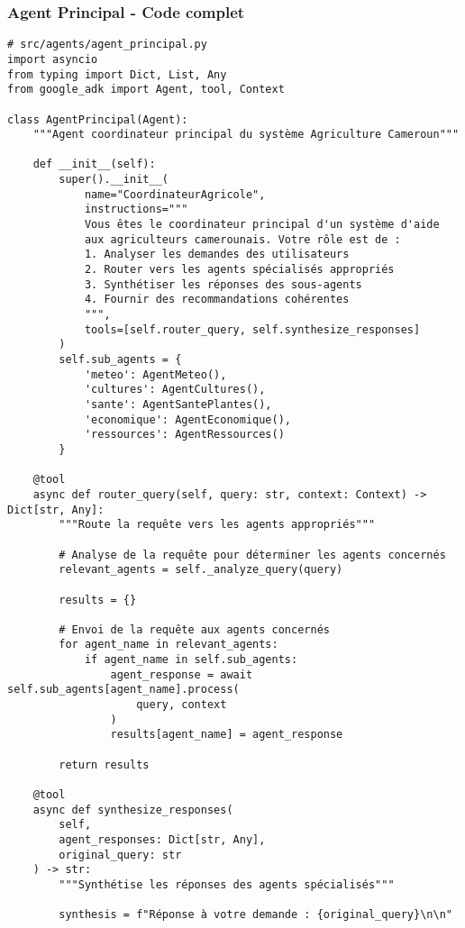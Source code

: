 \subsubsection{Agent Principal - Code complet}
\begin{verbatim}
# src/agents/agent_principal.py
import asyncio
from typing import Dict, List, Any
from google_adk import Agent, tool, Context

class AgentPrincipal(Agent):
    """Agent coordinateur principal du système Agriculture Cameroun"""

    def __init__(self):
        super().__init__(
            name="CoordinateurAgricole",
            instructions="""
            Vous êtes le coordinateur principal d'un système d'aide
            aux agriculteurs camerounais. Votre rôle est de :
            1. Analyser les demandes des utilisateurs
            2. Router vers les agents spécialisés appropriés
            3. Synthétiser les réponses des sous-agents
            4. Fournir des recommandations cohérentes
            """,
            tools=[self.router_query, self.synthesize_responses]
        )
        self.sub_agents = {
            'meteo': AgentMeteo(),
            'cultures': AgentCultures(),
            'sante': AgentSantePlantes(),
            'economique': AgentEconomique(),
            'ressources': AgentRessources()
        }

    @tool
    async def router_query(self, query: str, context: Context) -> Dict[str, Any]:
        """Route la requête vers les agents appropriés"""

        # Analyse de la requête pour déterminer les agents concernés
        relevant_agents = self._analyze_query(query)

        results = {}

        # Envoi de la requête aux agents concernés
        for agent_name in relevant_agents:
            if agent_name in self.sub_agents:
                agent_response = await self.sub_agents[agent_name].process(
                    query, context
                )
                results[agent_name] = agent_response

        return results

    @tool
    async def synthesize_responses(
        self,
        agent_responses: Dict[str, Any],
        original_query: str
    ) -> str:
        """Synthétise les réponses des agents spécialisés"""

        synthesis = f"Réponse à votre demande : {original_query}\n\n"


\end{verbatim}
